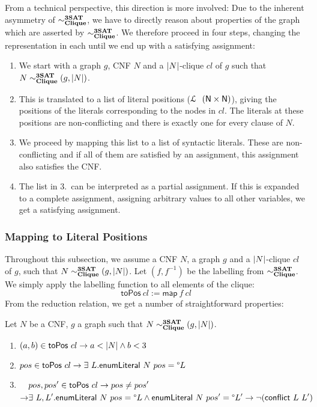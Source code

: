 \documentclass[a4paper,UKenglish,cleveref, autoref]{lipics-v2019}
\begin{document}
From a technical perspective, this direction is more involved: Due to the inherent asymmetry of $\sim^{\textbf{3SAT}}_{\textbf{Clique}}$, we have to directly reason about properties of the graph which are asserted by $\sim^{\textbf{3SAT}}_{\textbf{Clique}}$. We therefore proceed in four steps, changing the representation in each until we end up with a satisfying assignment:
\begin{enumerate}
  \item We start with a graph $g$, CNF $N$ and a $|N|$-clique $cl$ of $g$ such that $N \sim^{\textbf{3SAT}}_{\textbf{Clique}} (g, |N|)$.
  \item This is translated to a list of literal positions ($\mathcal{L}~~(\mathsf{N} \times \mathsf{N})$), giving the positions of the literals corresponding to the nodes in $cl$. The literals at these positions are non-conflicting and there is exactly one for every clause of $N$.
  \item We proceed by mapping this list to a list of syntactic literals. These are non-conflicting and if all of them are satisfied by an assignment, this assignment also satisfies the CNF. 
  \item The list in 3.\ can be interpreted as a partial assignment. If this is expanded to a complete assignment, assigning arbitrary values to all other variables, we get a satisfying assignment.
\end{enumerate}

\subsubsection{Mapping to Literal Positions}
Throughout this subsection, we assume a CNF $N$, a graph $g$ and a $|N|$-clique $cl$ of $g$, such that $N \sim^{\textbf{3SAT}}_{\textbf{Clique}} (g, |N|)$. 
Let $(f, f^{-1})$ be the labelling from $\sim^{\textbf{3SAT}}_{\textbf{Clique}}$. We simply apply the labelling function to all elements of the clique:
\[\textsf{toPos}~cl := \textsf{map}~f~cl \]
From the reduction relation, we get a number of straightforward properties:
\begin{lemma}\label{prop:toPosbasic}
  Let $N$ be a CNF, $g$ a graph such that $N \sim^{\textbf{3SAT}}_{\textbf{Clique}} (g, |N|)$. 
  \begin{enumerate}
    \item $(a, b) \in \normalfont\textsf{toPos}~cl \rightarrow a < |N| \land b < 3$ 
    \item $pos \in \normalfont\textsf{toPos}~cl \rightarrow \exists~L. \textsf{enumLiteral}~N~pos = \degree L$
    \item $\begin{aligned}[t] 
        &pos, pos' \in \normalfont\textsf{toPos}~cl \rightarrow pos \neq pos' \\
    \rightarrow& \exists~L,L'. \normalfont\textsf{enumLiteral}~N~pos = \degree L \land \normalfont\textsf{enumLiteral}~N~pos' = \degree L' \rightarrow \lnot{(\normalfont\textsf{conflict}~L~L')} 
  \end{aligned}$
  \end{enumerate}
\end{lemma}
\end{document}
